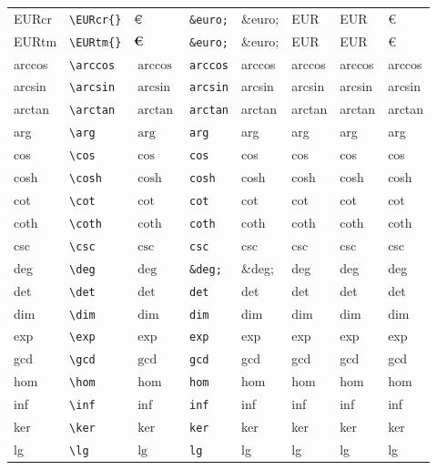 \documentclass[11pt]{article}
\begin{document}
\begin{longtable}{llllllll}
EURcr & \texttt{\textbackslash{}EURcr\{\}} & $\mbox{\EURcr{}}$ & \texttt{\&euro;} & \&euro; & EUR & EUR & €\\
EURtm & \texttt{\textbackslash{}EURtm\{\}} & $\mbox{\EURtm{}}$ & \texttt{\&euro;} & \&euro; & EUR & EUR & €\\
arccos & \texttt{\textbackslash{}arccos} & $\arccos$ & \texttt{arccos} & arccos & arccos & arccos & arccos\\
arcsin & \texttt{\textbackslash{}arcsin} & $\arcsin$ & \texttt{arcsin} & arcsin & arcsin & arcsin & arcsin\\
arctan & \texttt{\textbackslash{}arctan} & $\arctan$ & \texttt{arctan} & arctan & arctan & arctan & arctan\\
arg & \texttt{\textbackslash{}arg} & $\arg$ & \texttt{arg} & arg & arg & arg & arg\\
cos & \texttt{\textbackslash{}cos} & $\cos$ & \texttt{cos} & cos & cos & cos & cos\\
cosh & \texttt{\textbackslash{}cosh} & $\cosh$ & \texttt{cosh} & cosh & cosh & cosh & cosh\\
cot & \texttt{\textbackslash{}cot} & $\cot$ & \texttt{cot} & cot & cot & cot & cot\\
coth & \texttt{\textbackslash{}coth} & $\coth$ & \texttt{coth} & coth & coth & coth & coth\\
csc & \texttt{\textbackslash{}csc} & $\csc$ & \texttt{csc} & csc & csc & csc & csc\\
deg & \texttt{\textbackslash{}deg} & $\deg$ & \texttt{\&deg;} & \&deg; & deg & deg & deg\\
det & \texttt{\textbackslash{}det} & $\det$ & \texttt{det} & det & det & det & det\\
dim & \texttt{\textbackslash{}dim} & $\dim$ & \texttt{dim} & dim & dim & dim & dim\\
exp & \texttt{\textbackslash{}exp} & $\exp$ & \texttt{exp} & exp & exp & exp & exp\\
gcd & \texttt{\textbackslash{}gcd} & $\gcd$ & \texttt{gcd} & gcd & gcd & gcd & gcd\\
hom & \texttt{\textbackslash{}hom} & $\hom$ & \texttt{hom} & hom & hom & hom & hom\\
inf & \texttt{\textbackslash{}inf} & $\inf$ & \texttt{inf} & inf & inf & inf & inf\\
ker & \texttt{\textbackslash{}ker} & $\ker$ & \texttt{ker} & ker & ker & ker & ker\\
lg & \texttt{\textbackslash{}lg} & $\lg$ & \texttt{lg} & lg & lg & lg & lg\\

\end{longtable}
\end{document}
